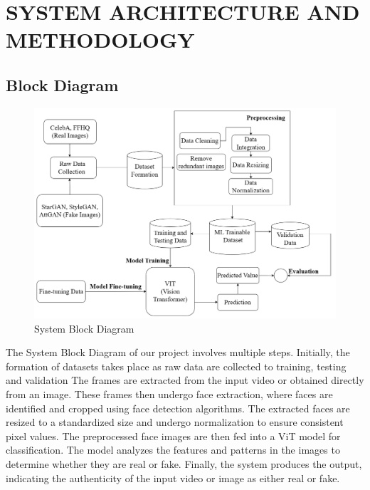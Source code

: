 \section{SYSTEM ARCHITECTURE AND METHODOLOGY }
\subsection{Block Diagram}
\begin{figure}[h]
    \centering
    \includegraphics[width= 6.5in ]{img/Model_Architecture.drawio (5).png}
    \caption{{System Block Diagram}}

\end{figure}
\justify
The System Block Diagram of our project involves multiple steps. Initially, the formation of datasets takes place as raw data are collected to training, testing and validation  The frames are extracted from the input video or obtained directly from an image. These frames then undergo face extraction, where faces are identified and cropped using face detection algorithms. The extracted faces are resized to a standardized size and undergo normalization to ensure consistent pixel values. The preprocessed face images are then fed into a ViT model for classification. The model analyzes the features and patterns in the images to determine whether they are real or fake. Finally, the system produces the output, indicating the authenticity of the input video or image as either real or fake.
